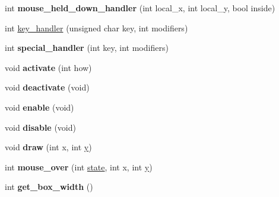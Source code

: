 \begin{DoxyCompactItemize}
\item 
\hypertarget{class_g_l_u_i___text_box_a825107a1c8c86b3a6327f62e634e8a4e}{int {\bfseries mouse\+\_\+held\+\_\+down\+\_\+handler} (int local\+\_\+x, int local\+\_\+y, bool inside)}\label{class_g_l_u_i___text_box_a825107a1c8c86b3a6327f62e634e8a4e}

\item 
int \hyperlink{class_g_l_u_i___text_box_acdb3ac37acc3c3ba6260ea73f413257f}{key\+\_\+handler} (unsigned char key, int modifiers)
\item 
\hypertarget{class_g_l_u_i___text_box_a2fa1ab2b0026f6eeea9a4e25107637f0}{int {\bfseries special\+\_\+handler} (int key, int modifiers)}\label{class_g_l_u_i___text_box_a2fa1ab2b0026f6eeea9a4e25107637f0}

\item 
\hypertarget{class_g_l_u_i___text_box_a700f7d07a42c613b95f212959a7329d2}{void {\bfseries activate} (int how)}\label{class_g_l_u_i___text_box_a700f7d07a42c613b95f212959a7329d2}

\item 
\hypertarget{class_g_l_u_i___text_box_ad622284de7190c5c51de5538fb076b79}{void {\bfseries deactivate} (void)}\label{class_g_l_u_i___text_box_ad622284de7190c5c51de5538fb076b79}

\item 
\hypertarget{class_g_l_u_i___text_box_a907c7dc3dcef136f551cb73ca243143a}{void {\bfseries enable} (void)}\label{class_g_l_u_i___text_box_a907c7dc3dcef136f551cb73ca243143a}

\item 
\hypertarget{class_g_l_u_i___text_box_ac04b5e44ae6d804ea3b499ee017f6b22}{void {\bfseries disable} (void)}\label{class_g_l_u_i___text_box_ac04b5e44ae6d804ea3b499ee017f6b22}

\item 
\hypertarget{class_g_l_u_i___text_box_a7bc1b7cdead3e55b2e39c6258284ef05}{void {\bfseries draw} (int x, int \hyperlink{_ice_utils_8h_aa7ffaed69623192258fb8679569ff9ba}{y})}\label{class_g_l_u_i___text_box_a7bc1b7cdead3e55b2e39c6258284ef05}

\item 
\hypertarget{class_g_l_u_i___text_box_abd6406a461f85db80f75a806f3da29d8}{int {\bfseries mouse\+\_\+over} (int \hyperlink{structstate}{state}, int x, int \hyperlink{_ice_utils_8h_aa7ffaed69623192258fb8679569ff9ba}{y})}\label{class_g_l_u_i___text_box_abd6406a461f85db80f75a806f3da29d8}

\item 
\hypertarget{class_g_l_u_i___text_box_aab2bc7ff59e3fb9a7ec6accd98588e61}{int {\bfseries get\+\_\+box\+\_\+width} ()}\label{class_g_l_u_i___text_box_aab2bc7ff59e3fb9a7ec6accd98588e61}


\end{DoxyCompactItemize}
